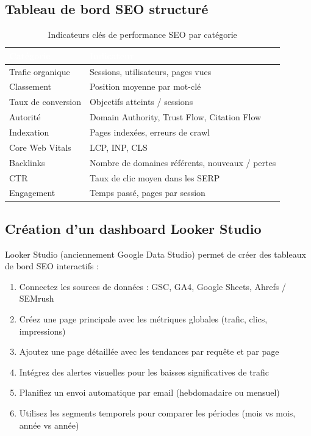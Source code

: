 \documentclass[12pt,a4paper,twoside]{report}
\begin{document}
\subsection{Tableau de bord SEO structuré}

\begin{table}[H]
\centering
\caption{Indicateurs clés de performance SEO par catégorie}
\label{tab:kpis}
\begin{tabular}{|l|l|}
\hline
\rowcolor{primary}\textcolor{white}{\textbf{Catégorie}} & \textcolor{white}{\textbf{Indicateur}} \\
\hline
Trafic organique & Sessions, utilisateurs, pages vues \\
\hline
Classement & Position moyenne par mot-clé \\
\hline
Taux de conversion & Objectifs atteints / sessions \\
\hline
Autorité & Domain Authority, Trust Flow, Citation Flow \\
\hline
Indexation & Pages indexées, erreurs de crawl \\
\hline
Core Web Vitals & LCP, INP, CLS \\
\hline
Backlinks & Nombre de domaines référents, nouveaux / pertes \\
\hline
CTR & Taux de clic moyen dans les SERP \\
\hline
Engagement & Temps passé, pages par session \\
\hline
\end{tabular}
\end{table}

\subsection{Création d'un dashboard Looker Studio}

Looker Studio (anciennement Google Data Studio) permet de créer des tableaux de bord SEO interactifs :

\begin{enumerate}
    \item Connectez les sources de données : GSC, GA4, Google Sheets, Ahrefs / SEMrush
    \item Créez une page principale avec les métriques globales (trafic, clics, impressions)
    \item Ajoutez une page détaillée avec les tendances par requête et par page
    \item Intégrez des alertes visuelles pour les baisses significatives de trafic
    \item Planifiez un envoi automatique par email (hebdomadaire ou mensuel)
    \item Utilisez les segments temporels pour comparer les périodes (mois vs mois, année vs année)
\end{enumerate}
\end{document}

